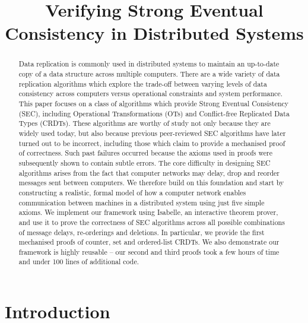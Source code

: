 \documentclass[acmlarge,review,anonymous]{acmart}\settopmatter{printfolios=true}
\begin{document}
\title{Verifying Strong Eventual Consistency in Distributed Systems}

\begin{abstract}
Data replication is commonly used in distributed systems to maintain an up-to-date copy of a data structure across multiple computers. There are a wide variety of data replication algorithms which explore the trade-off between varying levels of data consistency across computers versus operational constraints and system performance. This paper focuses on a class of algorithms which provide Strong Eventual Consistency (SEC), including Operational Transformations (OTs) and Conflict-free Replicated Data Types (CRDTs). These algorithms are worthy of study not only because they are widely used today, but also because previous peer-reviewed SEC algorithms have later turned out to be incorrect, including those which claim to provide a mechanised proof of correctness.
Such past failures occurred because the axioms used in proofs were subsequently shown to contain subtle errors. The core difficulty in designing SEC algorithms arises from the fact that computer networks may delay, drop and reorder messages sent between computers. We therefore build on this foundation and start by constructing a realistic, formal model of how a computer network enables communication between machines in a distributed system using just five simple axioms. We implement our framework using Isabelle, an interactive theorem prover, and use it to prove the correctness of SEC algorithms across all possible combinations of message delays, re-orderings and deletions. In particular, we provide the first mechanised proofs of counter, set and ordered-list CRDTs. We also demonstrate our framework is highly reusable -- our second and third proofs took a few hours of time and under 100 lines of additional code.
\end{abstract}
\maketitle



\section{Introduction}
\label{sect.introduction}
\end{document}

